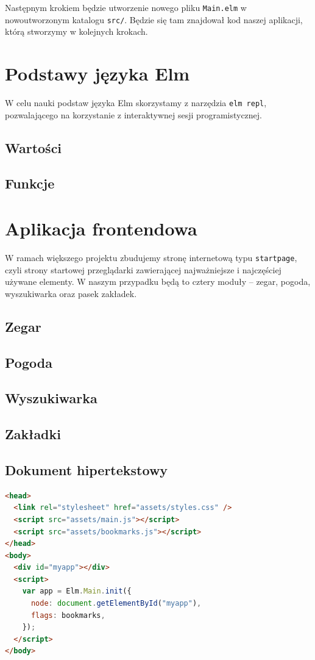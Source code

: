 \documentclass[twoside,a4paper]{report}
\begin{document}
Następnym krokiem będzie utworzenie nowego pliku \texttt{Main.elm} w nowoutworzonym katalogu \texttt{src/}.
Będzie się tam znajdował kod naszej aplikacji, którą stworzymy w kolejnych krokach.

\section{Podstawy języka Elm}
W celu nauki podstaw języka Elm skorzystamy z narzędzia \texttt{elm repl}, pozwalającego na korzystanie z interaktywnej sesji programistycznej.
\subsection{Wartości}

\subsection{Funkcje}

\section{Aplikacja frontendowa}
W ramach większego projektu zbudujemy stronę internetową typu \texttt{startpage}, czyli strony startowej przeglądarki zawierającej najważniejsze i najczęściej używane elementy.
W naszym przypadku będą to cztery moduły -- zegar, pogoda, wyszukiwarka oraz pasek zakładek.

\subsection{Zegar}

\subsection{Pogoda}

\subsection{Wyszukiwarka}

\subsection{Zakładki}

\subsection{Dokument hipertekstowy}
\begin{lstlisting}[caption={Zawartość pliku \texttt{index.html}},label={lst:index.html},language=html]
<head>
  <link rel="stylesheet" href="assets/styles.css" />
  <script src="assets/main.js"></script>
  <script src="assets/bookmarks.js"></script>
</head>
<body>
  <div id="myapp"></div>
  <script>
    var app = Elm.Main.init({
      node: document.getElementById("myapp"),
      flags: bookmarks,
    });
  </script>
</body>
\end{lstlisting}
\end{document}
